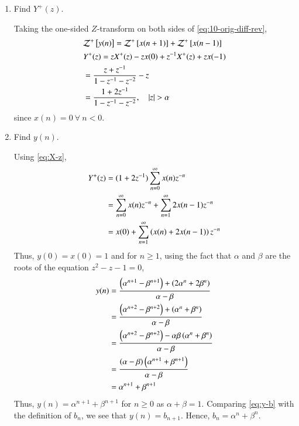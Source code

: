 \documentclass[journal,12pt,twocolumn]{IEEEtran}
\renewcommand\thesection{\arabic{section}}
\begin{document}
\begin{enumerate}[label=\thesection.\arabic*,ref=\thesection.\theenumi]
\item Find $Y^{+}(z)$. 

\solution Taking the one-sided $Z$-transform on both sides of \eqref{eq:10-orig-diff-rev},
\begin{align}
	&\mathcal{Z}^+{}\left[y(n)\right] = \mathcal{Z}^+{}\left[x(n + 1)\right] + \mathcal{Z}^+{}\left[x(n - 1)\right] \\
	&Y^+(z) = zX^+(z) - zx(0) + z^{-1}X^+(z) + zx(-1) \\
	&= \frac{z + z^{-1}}{1 - z^{-1} - z^{-2}} - z \\
	&= \frac{1 + 2z^{-1}}{1 - z^{-1} - z^{-2}}, \quad |z| > \alpha
\end{align}
since $x(n) = 0\ \forall\ n < 0$.
\item Find $y(n)$.
\label{pr:1-3}

\solution Using \eqref{eq:X-z},
\begin{align}
	Y^+(z) &= (1 + 2z^{-1})\sum_{n = 0}^{\infty}x(n)z^{-n} \\
	&= \sum_{n = 0}^{\infty}x(n)z^{-n} + \sum_{n = 1}^{\infty}2x(n - 1)z^{-n} \\
	&= x(0) + \sum_{n = 1}^{\infty}\left(x(n) + 2x(n - 1)\right)z^{-n}
\end{align}
Thus, $y(0) = x(0) = 1$ and for $n \ge 1$, using the fact that $\alpha$ and 
$\beta$ are the roots of the equation $z^2 - z - 1 = 0$,
\begin{align}
	y(n) &= \frac{\left(\alpha^{n + 1} - \beta^{n + 1}\right) + \left(2\alpha^n + 2\beta^n\right)}{\alpha - \beta} \\
	&= \frac{\left(\alpha^{n + 2} - \beta^{n + 2}\right) + \left(\alpha^{n} + \beta^{n}\right)}{\alpha - \beta} \label{eq:y-b} \\
	&= \frac{\left(\alpha^{n + 2} - \beta^{n + 2}\right) - \alpha\beta\left(\alpha^{n} + \beta^{n}\right)}{\alpha - \beta} \\
	&= \frac{\left(\alpha - \beta\right)\left(\alpha^{n + 1} + \beta^{n + 1}\right)}{\alpha - \beta} \\
	&= \alpha^{n + 1} + \beta^{n + 1}
\end{align}
Thus, $y(n) = \alpha^{n + 1} + \beta^{n + 1}$ for $n \geq 0$ as $\alpha + \beta = 1$.
Comparing \eqref{eq:y-b} with the definition of $b_n$, we see that $y(n) = b_{n + 1}$.
Hence, $b_n = \alpha^n + \beta^n$.
\end{enumerate}
\end{document}
